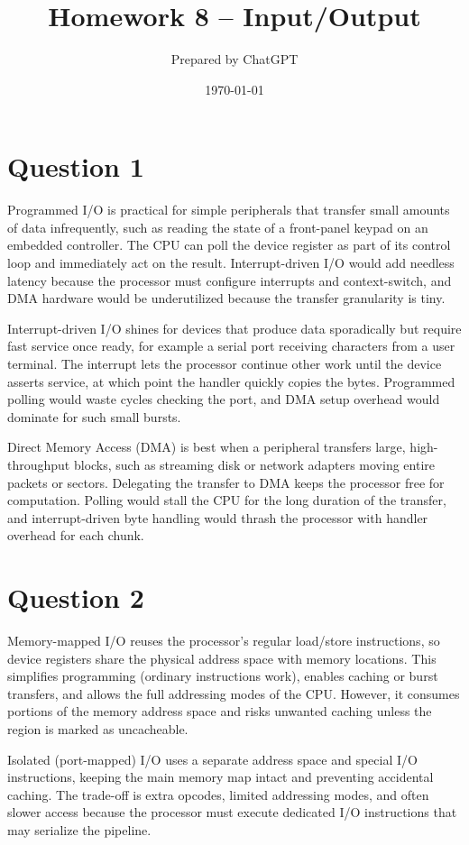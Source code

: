 \documentclass[12pt]{article}
\title{Homework 8 -- Input/Output}
\author{Prepared by ChatGPT}
\date{\today}
\begin{document}
\maketitle
\section*{Question 1}
Programmed I/O is practical for simple peripherals that transfer small amounts of data infrequently, such as reading the state of a front-panel keypad on an embedded controller. The CPU can poll the device register as part of its control loop and immediately act on the result. Interrupt-driven I/O would add needless latency because the processor must configure interrupts and context-switch, and DMA hardware would be underutilized because the transfer granularity is tiny.

Interrupt-driven I/O shines for devices that produce data sporadically but require fast service once ready, for example a serial port receiving characters from a user terminal. The interrupt lets the processor continue other work until the device asserts service, at which point the handler quickly copies the bytes. Programmed polling would waste cycles checking the port, and DMA setup overhead would dominate for such small bursts.

Direct Memory Access (DMA) is best when a peripheral transfers large, high-throughput blocks, such as streaming disk or network adapters moving entire packets or sectors. Delegating the transfer to DMA keeps the processor free for computation. Polling would stall the CPU for the long duration of the transfer, and interrupt-driven byte handling would thrash the processor with handler overhead for each chunk.

\section*{Question 2}
Memory-mapped I/O reuses the processor's regular load/store instructions, so device registers share the physical address space with memory locations. This simplifies programming (ordinary instructions work), enables caching or burst transfers, and allows the full addressing modes of the CPU. However, it consumes portions of the memory address space and risks unwanted caching unless the region is marked as uncacheable.

Isolated (port-mapped) I/O uses a separate address space and special I/O instructions, keeping the main memory map intact and preventing accidental caching. The trade-off is extra opcodes, limited addressing modes, and often slower access because the processor must execute dedicated I/O instructions that may serialize the pipeline.
\end{document}
